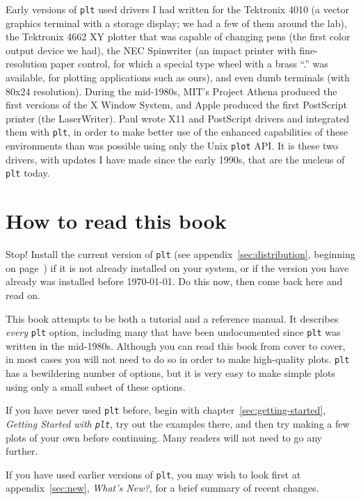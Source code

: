 \documentclass{book}
\begin{document}
%
%
Early versions of {\tt plt} used drivers I had written for the Tektronix 4010
(a vector graphics terminal with a storage display; we had a few of them around
the lab), the Tektronix 4662 XY plotter that was capable of changing pens (the
first color output device we had), the NEC Spinwriter (an impact printer with
fine-resolution paper control, for which a special type wheel with a brass
``.'' was available, for plotting applications such as ours), and even dumb
terminals (with 80x24 resolution).  During the mid-1980s, MIT's Project Athena
produced the first versions of the X Window System, and Apple produced the
first PostScript printer (the LaserWriter).  Paul wrote X11 and PostScript
drivers and integrated them with {\tt plt}, in order to make better use of the
enhanced capabilities of these environments than was possible using only the
Unix {\tt plot} API.  It is these two drivers, with updates I have made since
the early 1990s, that are the nucleus of {\tt plt} today.

\section{How to read this book}

Stop!  Install the current version of {\tt plt} (see
appendix~\ref{sec:distribution}, beginning on
page~\pageref{sec:distribution}) if it is not already installed on
your system, or if the version you have already was installed before
\today{}.  Do this now, then come back here and read on.

This book attempts to be both a tutorial and a reference manual.  It
describes {\em every} {\tt plt} option, including many that have been
undocumented since {\tt plt} was written in the mid-1980s.  Although
you can read this book from cover to cover, in most cases you will not
need to do so in order to make high-quality plots.  {\tt plt} has a
bewildering number of options, but it is very easy to make simple
plots using only a small subset of these options.

If you have never used {\tt plt} before, begin with
chapter~\ref{sec:getting-started}, {\em Getting Started with {\tt plt}},
try out the examples there, and then try making a few plots of your
own before continuing.  Many readers will not need to go any further.

If you have used earlier versions of {\tt plt}, you may wish to look
first at appendix~\ref{sec:new}, {\em What's New?}, for a brief
summary of recent changes.
\end{document}
